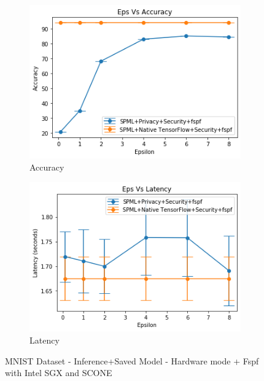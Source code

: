 \begin{figure}
\begin{subfigure}{0.5\textwidth}
         \includegraphics[width=\textwidth]{images/Inference/MnistPSAccuracyInference.png}
         \caption{Accuracy}
         \label{fig:appendixPSMnistAccuracyInference}
     \end{subfigure}
     \begin{subfigure}{0.5\textwidth}
         \includegraphics[width=\textwidth]{images/Inference/MnistPSLatencyInference.png}
         \caption{Latency}
         \label{fig:appendixPSMnistLatencyInference}
     \end{subfigure}
        \caption{MNIST Dataset - Inference+Saved Model - Hardware mode + Fspf with Intel SGX and SCONE}
\end{figure}


